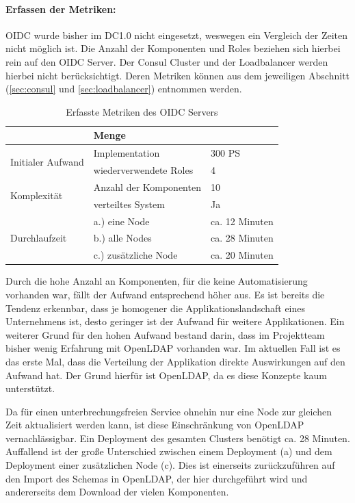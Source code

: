 \paragraph{Erfassen der Metriken:}
OIDC wurde bisher im DC1.0 nicht eingesetzt, weswegen ein Vergleich der Zeiten nicht möglich ist. Die Anzahl der Komponenten und Roles beziehen sich hierbei rein auf den OIDC Server. Der Consul Cluster und der Loadbalancer werden hierbei nicht berücksichtigt. Deren Metriken können aus dem jeweiligen Abschnitt (\ref{sec:consul} und \ref{sec:loadbalancer}) entnommen werden.
\begin{table}[ht]
\setlength{\tabcolsep}{5pt}
\renewcommand{\arraystretch}{1.5}
\centering
\begin{tabular}{|l|l|l|}
\hline
\rowcolor[HTML]{C0C0C0}
\multicolumn{2}{|c|}{\textbf{Metrik}} & \textbf{Menge}					\\ 
\hline
\multirow{2}{*}{Initialer Aufwand}	& Implementation & 300 PS	\\ 
\cline{2-3}
									& wiederverwendete Roles & 4		\\
\hline 
\multirow{2}{*}{Komplexität}			& Anzahl der Komponenten & 10		\\
\cline{2-3}
									& verteiltes System		& Ja 		\\
\hline
\multirow{3}{*}{Durchlaufzeit} & a.) eine Node		& ca. 12 Minuten	\\ 
\cline{2-3} 
									& b.) alle Nodes		& ca. 28 Minuten	\\ 
\cline{2-3}							
									& c.) zusätzliche Node	& ca. 20 Minuten \\
\hline
\end{tabular} 
\caption{Erfasste Metriken des OIDC Servers}
\label{tab:metric:oidc}
\end{table}
Durch die hohe Anzahl an Komponenten, für die keine Automatisierung vorhanden war, fällt der Aufwand entsprechend höher aus. Es ist bereits die Tendenz erkennbar, dass je homogener die Applikationslandschaft eines Unternehmens ist, desto geringer ist der Aufwand für weitere Applikationen. Ein weiterer Grund für den hohen Aufwand bestand darin, dass im Projektteam bisher wenig Erfahrung mit OpenLDAP vorhanden war. Im aktuellen Fall ist es das erste Mal, dass die Verteilung der Applikation direkte Auswirkungen auf den Aufwand hat. Der Grund hierfür ist OpenLDAP, da es diese Konzepte kaum unterstützt.

Da für einen unterbrechungsfreien Service ohnehin nur eine Node zur gleichen Zeit aktualisiert werden kann, ist diese Einschränkung von OpenLDAP vernachlässigbar. Ein Deployment des gesamten Clusters benötigt ca. 28 Minuten. Auffallend ist der große Unterschied zwischen einem Deployment (a) und dem Deployment einer zusätzlichen Node (c). Dies ist einerseits zurückzuführen auf den Import des Schemas in OpenLDAP, der hier durchgeführt wird und andererseits dem Download der vielen Komponenten.


